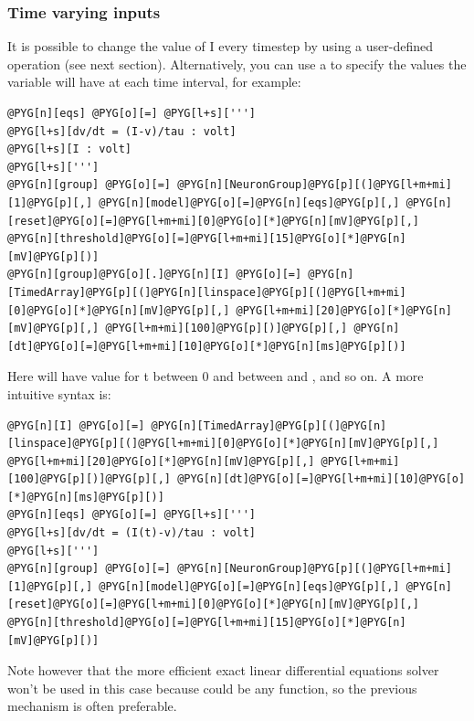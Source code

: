 \documentclass[letterpaper,10pt,english]{manual}
\begin{document}
\subsubsection{Time varying inputs}

It is possible to change the value of I every timestep by using a user-defined operation (see next
section). Alternatively, you can use a \hyperlink{brian.TimedArray}{} to specify the values the variable will
have at each time interval, for example:

\begin{Verbatim}[commandchars=@\[\]]
@PYG[n][eqs] @PYG[o][=] @PYG[l+s][''']
@PYG[l+s][dv/dt = (I-v)/tau : volt]
@PYG[l+s][I : volt]
@PYG[l+s][''']
@PYG[n][group] @PYG[o][=] @PYG[n][NeuronGroup]@PYG[p][(]@PYG[l+m+mi][1]@PYG[p][,] @PYG[n][model]@PYG[o][=]@PYG[n][eqs]@PYG[p][,] @PYG[n][reset]@PYG[o][=]@PYG[l+m+mi][0]@PYG[o][*]@PYG[n][mV]@PYG[p][,] @PYG[n][threshold]@PYG[o][=]@PYG[l+m+mi][15]@PYG[o][*]@PYG[n][mV]@PYG[p][)]
@PYG[n][group]@PYG[o][.]@PYG[n][I] @PYG[o][=] @PYG[n][TimedArray]@PYG[p][(]@PYG[n][linspace]@PYG[p][(]@PYG[l+m+mi][0]@PYG[o][*]@PYG[n][mV]@PYG[p][,] @PYG[l+m+mi][20]@PYG[o][*]@PYG[n][mV]@PYG[p][,] @PYG[l+m+mi][100]@PYG[p][)]@PYG[p][,] @PYG[n][dt]@PYG[o][=]@PYG[l+m+mi][10]@PYG[o][*]@PYG[n][ms]@PYG[p][)]
\end{Verbatim}

Here  will have value  for t between 0 and  between  and
, and so on. A more intuitive syntax is:

\begin{Verbatim}[commandchars=@\[\]]
@PYG[n][I] @PYG[o][=] @PYG[n][TimedArray]@PYG[p][(]@PYG[n][linspace]@PYG[p][(]@PYG[l+m+mi][0]@PYG[o][*]@PYG[n][mV]@PYG[p][,] @PYG[l+m+mi][20]@PYG[o][*]@PYG[n][mV]@PYG[p][,] @PYG[l+m+mi][100]@PYG[p][)]@PYG[p][,] @PYG[n][dt]@PYG[o][=]@PYG[l+m+mi][10]@PYG[o][*]@PYG[n][ms]@PYG[p][)]
@PYG[n][eqs] @PYG[o][=] @PYG[l+s][''']
@PYG[l+s][dv/dt = (I(t)-v)/tau : volt]
@PYG[l+s][''']
@PYG[n][group] @PYG[o][=] @PYG[n][NeuronGroup]@PYG[p][(]@PYG[l+m+mi][1]@PYG[p][,] @PYG[n][model]@PYG[o][=]@PYG[n][eqs]@PYG[p][,] @PYG[n][reset]@PYG[o][=]@PYG[l+m+mi][0]@PYG[o][*]@PYG[n][mV]@PYG[p][,] @PYG[n][threshold]@PYG[o][=]@PYG[l+m+mi][15]@PYG[o][*]@PYG[n][mV]@PYG[p][)]
\end{Verbatim}

Note however that the more efficient exact linear differential equations solver won't be used in this
case because  could be any function, so the previous mechanism is often preferable.
\end{document}
